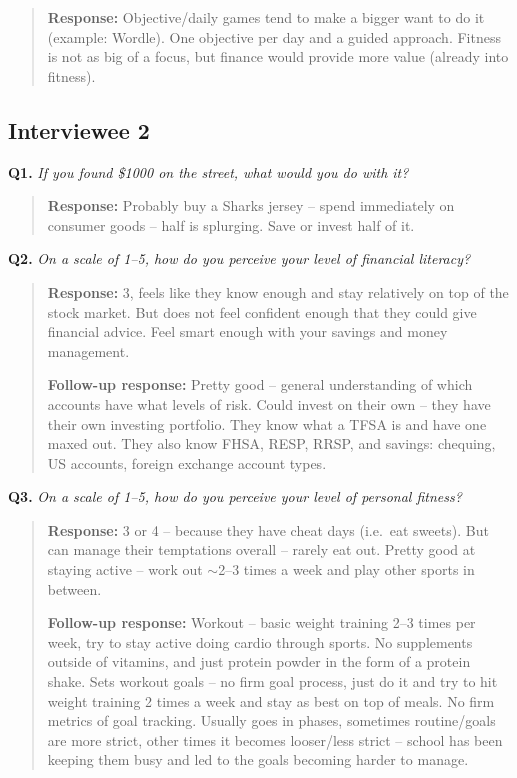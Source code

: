 \documentclass[12pt]{article}
\begin{document}
\begin{quote}
\textbf{Response:} Objective/daily games tend to make a bigger want to do it (example: Wordle). One objective per day and a guided approach. Fitness is not as big of a focus, but finance would provide more value (already into fitness).\par
\end{quote}

\subsection{Interviewee 2}

\medskip
\noindent\textbf{Q1.} \textit{If you found \$1000 on the street, what would you do with it?}

\begin{quote}
\textbf{Response:} Probably buy a Sharks jersey -- spend immediately on consumer goods -- half is splurging. Save or invest half of it.\par
\end{quote}

\medskip
\noindent\textbf{Q2.} \textit{On a scale of 1--5, how do you perceive your level of financial literacy?}

\begin{quote}
\textbf{Response:} 3, feels like they know enough and stay relatively on top of the stock market. But does not feel confident enough that they could give financial advice. Feel smart enough with your savings and money management.\par
\textbf{Follow-up response:} Pretty good -- general understanding of which accounts have what levels of risk. Could invest on their own -- they have their own investing portfolio. They know what a TFSA is and have one maxed out. They also know FHSA, RESP, RRSP, and savings: chequing, US accounts, foreign exchange account types.\par
\end{quote}

\medskip
\noindent\textbf{Q3.} \textit{On a scale of 1--5, how do you perceive your level of personal fitness?}

\begin{quote}
\textbf{Response:} 3 or 4 -- because they have cheat days (i.e.\ eat sweets). But can manage their temptations overall -- rarely eat out. Pretty good at staying active -- work out $\sim$2--3 times a week and play other sports in between.\par
\textbf{Follow-up response:} Workout -- basic weight training 2--3 times per week, try to stay active doing cardio through sports. No supplements outside of vitamins, and just protein powder in the form of a protein shake. Sets workout goals -- no firm goal process, just do it and try to hit weight training 2 times a week and stay as best on top of meals. No firm metrics of goal tracking. Usually goes in phases, sometimes routine/goals are more strict, other times it becomes looser/less strict -- school has been keeping them busy and led to the goals becoming harder to manage.\par
\end{quote}
\end{document}
